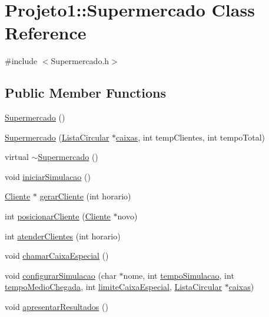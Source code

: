 \hypertarget{classProjeto1_1_1Supermercado}{
\section{Projeto1::Supermercado Class Reference}
\label{classProjeto1_1_1Supermercado}
}


{\ttfamily \#include $<$Supermercado.h$>$}

\subsection*{Public Member Functions}
\begin{DoxyCompactItemize}
\item 
\hyperlink{classProjeto1_1_1Supermercado_a712c285ce22c7b4cd0f4982484fcb092}{Supermercado} ()
\item 
\hyperlink{classProjeto1_1_1Supermercado_abb21b74f59b760e1e020bd706ad317ce}{Supermercado} (\hyperlink{classProjeto1_1_1ListaCircular}{ListaCircular} $\ast$\hyperlink{classProjeto1_1_1Supermercado_a0377fe11973f887d33fc7c743dd499de}{caixas}, int tempClientes, int tempoTotal)
\item 
virtual \hyperlink{classProjeto1_1_1Supermercado_a45e97c3a5c1b125fb2ad826270ba29eb}{$\sim$Supermercado} ()
\item 
void \hyperlink{classProjeto1_1_1Supermercado_a95984fac6635ea22f660e4038266b132}{iniciarSimulacao} ()
\item 
\hyperlink{classProjeto1_1_1Cliente}{Cliente} $\ast$ \hyperlink{classProjeto1_1_1Supermercado_a8182c122d2b8141f34c423762433c4f2}{gerarCliente} (int horario)
\item 
int \hyperlink{classProjeto1_1_1Supermercado_a006f42c2ab267236c96c5037230dd43a}{posicionarCliente} (\hyperlink{classProjeto1_1_1Cliente}{Cliente} $\ast$novo)
\item 
int \hyperlink{classProjeto1_1_1Supermercado_a7f998920216d84164f1feeda811aa7a4}{atenderClientes} (int horario)
\item 
void \hyperlink{classProjeto1_1_1Supermercado_a9e2055bab0973293e53c24154256a126}{chamarCaixaEspecial} ()
\item 
void \hyperlink{classProjeto1_1_1Supermercado_a918550e12e3f815b5aff5b5449886342}{configurarSimulacao} (char $\ast$nome, int \hyperlink{classProjeto1_1_1Supermercado_a6ec7501178b500d6a82330c99f95867e}{tempoSimulacao}, int \hyperlink{Main_8cpp_a0b097839315eb6a33ba1e11ce290fc9b}{tempoMedioChegada}, int \hyperlink{classProjeto1_1_1Supermercado_a11e5d386fe154d3e8ee3d8f7fa3d28a1}{limiteCaixaEspecial}, \hyperlink{classProjeto1_1_1ListaCircular}{ListaCircular} $\ast$\hyperlink{classProjeto1_1_1Supermercado_a0377fe11973f887d33fc7c743dd499de}{caixas})
\item 
void \hyperlink{classProjeto1_1_1Supermercado_a1c5c7fba6e33df1e597a2ab446dd5dd7}{apresentarResultados} ()
\end{DoxyCompactItemize}
